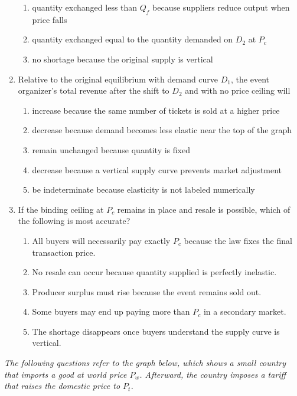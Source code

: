 \documentclass[10pt]{article}
\newenvironment{choiceslist}
  {\begin{enumerate}[label=(\Alph*), leftmargin=1.55em, itemsep=0.1em, topsep=0.15em, parsep=0pt]}
  {\end{enumerate}}
\newenvironment{stimulus}
  {\begin{center}\begin{minipage}{0.97\columnwidth}\footnotesize\itshape\setlength{\tabcolsep}{3pt}\renewcommand{\arraystretch}{0.96}}
  {\end{minipage}\end{center}}
\begin{document}
\begin{multicols*}{2}
\begin{enumerate}[series=curveq, leftmargin=*, itemsep=0.8em, topsep=0.18em, parsep=0pt]
\begin{choiceslist}
\item quantity exchanged less than $Q_f$ because suppliers reduce output when price falls
\item quantity exchanged equal to the quantity demanded on $D_2$ at $P_c$
\item no shortage because the original supply is vertical
\end{choiceslist}
\item Relative to the original equilibrium with demand curve $D_1$, the event organizer's total revenue after the shift to $D_2$ and with no price ceiling will
\begin{choiceslist}
\item increase because the same number of tickets is sold at a higher price
\item decrease because demand becomes less elastic near the top of the graph
\item remain unchanged because quantity is fixed
\item decrease because a vertical supply curve prevents market adjustment
\item be indeterminate because elasticity is not labeled numerically
\end{choiceslist}
\item If the binding ceiling at $P_c$ remains in place and resale is possible, which of the following is most accurate?
\begin{choiceslist}
\item All buyers will necessarily pay exactly $P_c$ because the law fixes the final transaction price.
\item No resale can occur because quantity supplied is perfectly inelastic.
\item Producer surplus must rise because the event remains sold out.
\item Some buyers may end up paying more than $P_c$ in a secondary market.
\item The shortage disappears once buyers understand the supply curve is vertical.
\end{choiceslist}
\end{enumerate}
\begin{stimulus}
The following questions refer to the graph below, which shows a small country that imports a good at world price $P_w$. Afterward, the country imposes a tariff that raises the domestic price to $P_t$.


\end{stimulus}
\end{multicols*}
\end{document}
